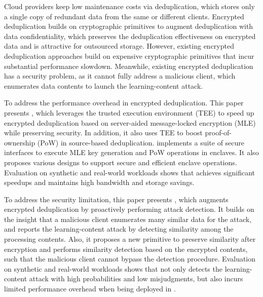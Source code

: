 \begin{englishabstract}
    Cloud providers keep low maintenance costs via deduplication, which stores only a single copy of redundant data from the same or different clients. 
    Encrypted deduplication builds on cryptographic primitives to augment deduplication with data confidentiality, which preserves the deduplication effectiveness on encrypted data and is attractive for outsourced storage. However, existing encrypted deduplication approaches build on expensive cryptographic primitives that incur substantial performance slowdown. Meanwhile, existing encrypted deduplication has a security problem, as it cannot fully address a malicious client, which enumerates data contents to launch the learning-content attack.
    
    To address the performance overhead in encrypted deduplication. This paper presents \sysnameS, which leverages the trusted execution environment (TEE) to speed up encrypted deduplication based on server-aided message-locked encryption (MLE) while preserving security. In addition, it also uses TEE to boost proof-of-ownership (PoW) in source-based deduplication. \sysnameS implements a suite of secure interfaces to execute MLE key generation and PoW operations in enclaves. It also proposes various designs to support secure and efficient enclave operations. Evaluation on synthetic and real-world workloads shows that \sysnameS achieves significant speedups and maintains high bandwidth and storage savings.

    To address the security limitation, this paper presents \sysnameF, which augments encrypted deduplication by proactively performing attack detection. It builds on the insight that a malicious client enumerates many similar data for the attack, and reports the learning-content attack by detecting similarity among the processing contents. Also, it proposes a new primitive to preserve similarity after encryption and performs similarity detection based on the encrypted contents, such that the malicious client cannot bypass the detection procedure. Evaluation on synthetic and real-world workloads shows that \sysnameF not only detects the learning-content attack with high probabilities and low misjudgments, but also incurs limited performance overhead when being deployed in \sysnameS.
    
\end{englishabstract}